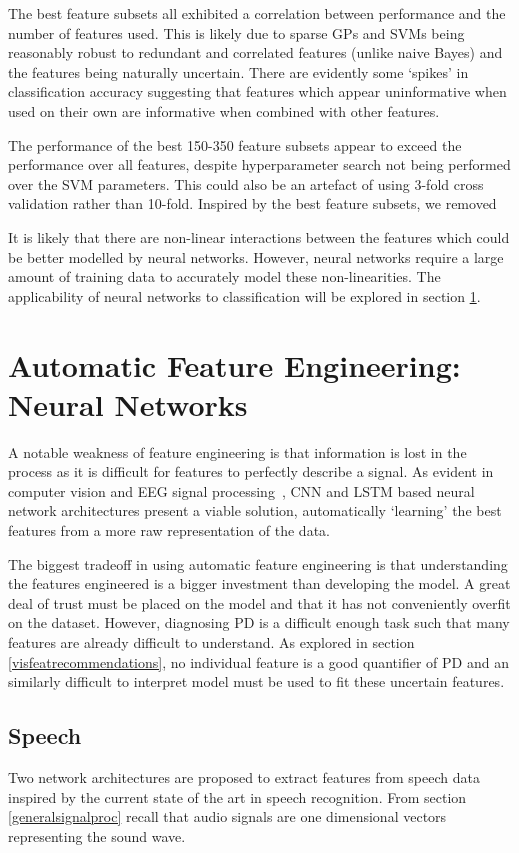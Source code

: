 \documentclass[12pt, twoside]{book}
\begin{document}
The best feature subsets all exhibited a correlation between performance and the number of features used. This is likely due to sparse GPs and SVMs being reasonably robust to redundant and correlated features (unlike naive Bayes) and the features being naturally uncertain. There are evidently some  `spikes' in classification accuracy suggesting that features which appear uninformative when used on their own are informative when combined with other features. 

The performance of the best 150-350 feature subsets appear to exceed the performance over all features, despite hyperparameter search not being performed over the SVM parameters. This could also be an artefact of using 3-fold cross validation rather than 10-fold. Inspired by the best feature subsets, we removed 

It is likely that there are non-linear interactions between the features which could be better modelled by neural networks. However, neural networks require a large amount of training data to accurately model these non-linearities. The applicability of neural networks to classification will be explored in section \ref{automaticfeatureengineering}.


\section{Automatic Feature Engineering: Neural Networks}
\label{automaticfeatureengineering}
A notable weakness of feature engineering is that information is lost in the process as it is difficult for features to perfectly describe a signal. As evident in computer vision and EEG signal processing~\cite{bashivan2015learning}, CNN and LSTM based neural network architectures present a viable solution, automatically `learning' the best features from a more raw representation of the data. 

The biggest tradeoff in using automatic feature engineering is that understanding the features engineered is a bigger investment than developing the model. A great deal of trust must be placed on the model and that it has not conveniently overfit on the dataset. However, diagnosing PD is a difficult enough task such that many features are already difficult to understand. As explored in section \ref{visfeatrecommendations}, no individual feature is a good quantifier of PD and an similarly difficult to interpret model must be used to fit these uncertain features.

\subsection{Speech}
Two network architectures are proposed to extract features from speech data inspired by the current state of the art in speech recognition. From section \ref{generalsignalproc} recall that audio signals are one dimensional vectors representing the sound wave. 
\end{document}

